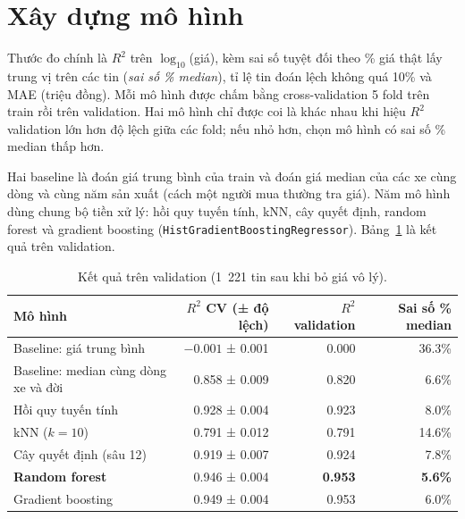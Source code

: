 
\section{Xây dựng mô hình}

Thước đo chính là $R^2$ trên $\log_{10}$(giá), kèm sai số tuyệt đối theo \% giá thật lấy trung vị trên các tin
(\textit{sai số \% median}), tỉ lệ tin đoán lệch không quá 10\% và MAE (triệu đồng). Mỗi mô hình được chấm bằng
cross-validation 5 fold trên train rồi trên validation. Hai mô hình chỉ được coi là khác nhau khi hiệu $R^2$ validation
lớn hơn độ lệch giữa các fold; nếu nhỏ hơn, chọn mô hình có sai số \% median thấp hơn.

Hai baseline là đoán giá trung bình của train và đoán giá median của các xe cùng dòng và cùng năm sản xuất (cách một
người mua thường tra giá). Năm mô hình dùng chung bộ tiền xử lý: hồi quy tuyến tính, kNN, cây quyết định, random forest
\cite{tab-rf} và gradient boosting (\texttt{HistGradientBoostingRegressor}). Bảng~\ref{tab:tab-val} là kết quả trên
validation.

\begin{table}[H]\centering
\caption{Kết quả trên validation (1~221 tin sau khi bỏ giá vô lý).}\label{tab:tab-val}
\small
\begin{tabular}{lrrr}
\toprule
Mô hình & $R^2$ CV (± độ lệch) & $R^2$ validation & Sai số \% median \\
\midrule
Baseline: giá trung bình & $-0.001$ ± 0.001 & 0.000 & 36.3\% \\
Baseline: median cùng dòng xe và đời & 0.858 ± 0.009 & 0.820 & 6.6\% \\
Hồi quy tuyến tính & 0.928 ± 0.004 & 0.923 & 8.0\% \\
kNN ($k = 10$) & 0.791 ± 0.012 & 0.791 & 14.6\% \\
Cây quyết định (sâu 12) & 0.919 ± 0.007 & 0.924 & 7.8\% \\
\textbf{Random forest} & 0.946 ± 0.004 & \textbf{0.953} & \textbf{5.6\%} \\
Gradient boosting & 0.949 ± 0.004 & 0.953 & 6.0\% \\
\bottomrule
\end{tabular}
\end{table}

